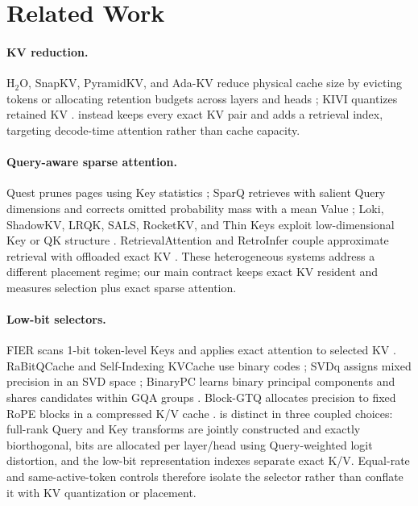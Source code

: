 \section{Related Work}
\label{sec:related}

\paragraph{KV reduction.}
H$_2$O, SnapKV, PyramidKV, and Ada-KV reduce physical cache size by evicting
tokens or allocating retention budgets across layers and heads
\citep{zhang2023h2o,li2024snapkv,cai2024pyramidkv,feng2024adakv}; KIVI
quantizes retained KV \citep{liu2024kivi}.  \method instead keeps every
exact KV pair and adds a retrieval index, targeting decode-time attention
rather than cache capacity.

\paragraph{Query-aware sparse attention.}
Quest prunes pages using Key statistics \citep{tang2024quest}; SparQ retrieves
with salient Query dimensions and corrects omitted probability mass with a
mean Value \citep{ribar2023sparq}; Loki, ShadowKV, LRQK, SALS, RocketKV, and
Thin Keys exploit low-dimensional Key or QK structure
\citep{singhania2024loki,sun2024shadowkv,li2025lrqk,mu2025sals,
behnam2025rocketkv,yao2026thinkeys}.  RetrievalAttention and RetroInfer couple
approximate retrieval with offloaded exact KV
\citep{liu2024retrievalattention,chen2025retroinfer}.  These heterogeneous
systems address a different placement regime; our main contract keeps exact
KV resident and measures selection plus exact sparse attention.

\paragraph{Low-bit selectors.}
FIER scans 1-bit token-level Keys and applies exact attention to selected KV
\citep{wang2025fier}.  RaBitQCache and Self-Indexing KVCache use binary codes
\citep{li2026rabitqcache,yang2026selfindexing}; SVDq assigns mixed precision
in an SVD space \citep{hong2025svdq}; BinaryPC learns binary principal
components and shares candidates within GQA groups \citep{yu2026binarypc}.
Block-GTQ allocates precision to fixed RoPE blocks in a compressed K/V cache
\citep{liang2026blockgtq}.  \method is distinct in three coupled choices:
full-rank Query and Key transforms are jointly constructed and exactly
biorthogonal, bits are allocated per layer/head using Query-weighted logit
distortion, and the low-bit representation indexes separate exact K/V.
Equal-rate and same-active-token controls therefore isolate the selector
rather than conflate it with KV quantization or placement.

